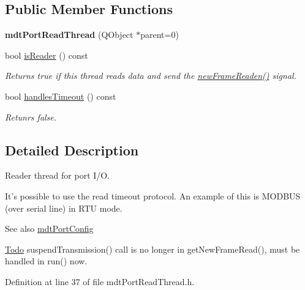 \subsection*{Public Member Functions}
\begin{DoxyCompactItemize}
\item 
\hypertarget{classmdt_port_read_thread_a180074c2ff60f5103d7e3aa27c1cdb01}{
{\bfseries mdtPortReadThread} (QObject $\ast$parent=0)}
\label{classmdt_port_read_thread_a180074c2ff60f5103d7e3aa27c1cdb01}

\item 
bool \hyperlink{classmdt_port_read_thread_a0138d613b61056c9f8373331de2d9a84}{isReader} () const 
\begin{DoxyCompactList}\small\item\em Returns true if this thread reads data and send the \hyperlink{classmdt_port_thread_a7fc2245c753fd65e1beffec211c41461}{newFrameReaden()} signal. \end{DoxyCompactList}\item 
\hypertarget{classmdt_port_read_thread_afa42f86f3fed878b8f44cacb3a2f41af}{
bool \hyperlink{classmdt_port_read_thread_afa42f86f3fed878b8f44cacb3a2f41af}{handlesTimeout} () const }
\label{classmdt_port_read_thread_afa42f86f3fed878b8f44cacb3a2f41af}

\begin{DoxyCompactList}\small\item\em Retunrs false. \end{DoxyCompactList}\end{DoxyCompactItemize}


\subsection{Detailed Description}
Reader thread for port I/O. 

It's possible to use the read timeout protocol. An example of this is MODBUS (over serial line) in RTU mode.

\begin{DoxySeeAlso}{See also}
\hyperlink{classmdt_port_config}{mdtPortConfig}
\end{DoxySeeAlso}
\begin{Desc}
\item[\hyperlink{todo__todo000025}{Todo}]suspendTransmission() call is no longer in getNewFrameRead(), must be handled in run() now. \end{Desc}


Definition at line 37 of file mdtPortReadThread.h.




